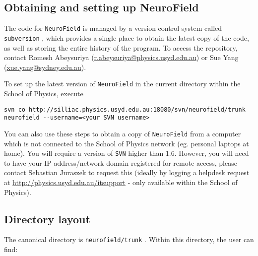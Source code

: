 \documentclass[12pt,a4paper]{article}
\newcommand{\type}[1]{ {\small\small\tt #1} }
\begin{document}
\subsection{Obtaining and setting up NeuroField}
\label{sec:obtain}

The code for \type{NeuroField} is managed by a version control system called \type{subversion}, which provides a single place to obtain the latest copy of the code, as well as storing the entire history of the program. To access the repository, contact Romesh Abeysuriya (\url{r.abeysuriya@physics.usyd.edu.au}) or Sue Yang (\url{xue.yang@sydney.edu.au}).

To set up the latest version of \type{NeuroField} in the current directory within the School of Physics, execute
\begin{lstlisting}
svn co http://silliac.physics.usyd.edu.au:18080/svn/neurofield/trunk neurofield --username=<your SVN username>
\end{lstlisting}

You can also use these steps to obtain a copy of \type{NeuroField} from a computer which is not connected to the School of Physics network (eg. personal laptops at home). You will require a version of \type{SVN} higher than 1.6. However, you will need to have your IP address/network domain registered for remote access, please contact Sebastian Juraszek to request this (ideally by logging a helpdesk request at \url{http://physics.usyd.edu.au/itsupport} - only available within the School of Physics). 

\subsection{Directory layout}

The canonical directory is \type{neurofield/trunk}. Within this directory, the user can find:
\end{document}
